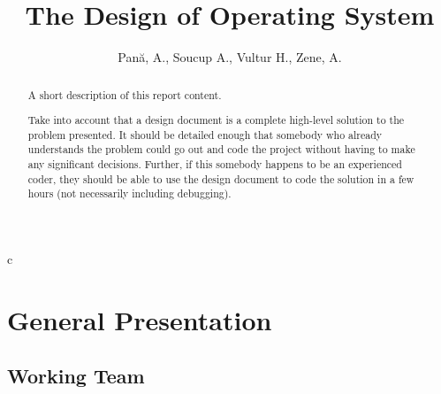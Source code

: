 \documentclass[a4paper,12pt]{report}
\title{The Design of \OSName{} Operating System}
\author{Pană, A., Soucup A., Vultur H., Zene, A. }
\begin{document}
c


\maketitle

\begin{abstract}
	A short description of this report content. 
	
	Take into account that a design document is a complete high-level solution to the problem presented. It should be detailed enough that somebody who already understands the problem could go out and code the project without having to make any significant decisions. Further, if this somebody happens to be an experienced coder, they should be able to use the design document to code the solution in a few hours (not necessarily including debugging). 
\end{abstract}


\chapter{General Presentation}

\section{Working Team}
\end{document}

